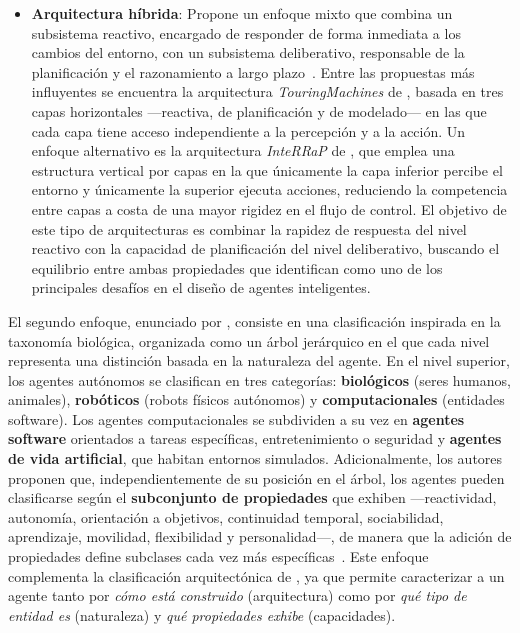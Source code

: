\begin{itemize}
\item \textbf{Arquitectura híbrida}:
Propone un enfoque mixto que combina un subsistema reactivo, encargado de responder de forma inmediata a los cambios del entorno, con un subsistema deliberativo, responsable de la planificación y el razonamiento a largo plazo~\cite{Wooldridge1995}. Entre las propuestas más influyentes se encuentra la arquitectura \textit{TouringMachines} de \textcite{ferguson1992touringmachines}, basada en tres capas horizontales —reactiva, de planificación y de modelado— en las que cada capa tiene acceso independiente a la percepción y a la acción. Un enfoque alternativo es la arquitectura \textit{InteRRaP} de \textcite{muller1995modelling}, que emplea una estructura vertical por capas en la que únicamente la capa inferior percibe el entorno y únicamente la superior ejecuta acciones, reduciendo la competencia entre capas a costa de una mayor rigidez en el flujo de control. El objetivo de este tipo de arquitecturas es combinar la rapidez de respuesta del nivel reactivo con la capacidad de planificación del nivel deliberativo, buscando el equilibrio entre ambas propiedades que \textcite{Wooldridge1995} identifican como uno de los principales desafíos en el diseño de agentes inteligentes.
\end{itemize}


El segundo enfoque, enunciado por \textcite{franklin1996agent}, consiste en una clasificación inspirada en la taxonomía biológica, organizada como un árbol jerárquico en el que cada nivel representa una distinción basada en la naturaleza del agente. En el nivel superior, los agentes autónomos se clasifican en tres categorías: \textbf{biológicos} (seres humanos, animales), \textbf{robóticos} (robots físicos autónomos) y \textbf{computacionales} (entidades software). Los agentes computacionales se subdividen a su vez en \textbf{agentes software} orientados a tareas específicas, entretenimiento o seguridad y \textbf{agentes de vida artificial}, que habitan entornos simulados. Adicionalmente, los autores proponen que, independientemente de su posición en el árbol, los agentes pueden clasificarse según el \textbf{subconjunto de propiedades} que exhiben ---reactividad, autonomía, orientación a objetivos, continuidad temporal, sociabilidad, aprendizaje, movilidad, flexibilidad y personalidad---, de manera que la adición de propiedades define subclases cada vez más específicas~\cite{franklin1996agent}. Este enfoque complementa la clasificación arquitectónica de \textcite{Wooldridge1995}, ya que permite caracterizar a un agente tanto por \textit{cómo está construido} (arquitectura) como por \textit{qué tipo de entidad es} (naturaleza) y \textit{qué propiedades exhibe} (capacidades).


